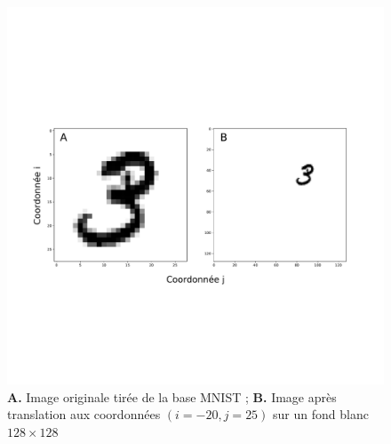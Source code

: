 \begin{figure}[th]
\centering
\includegraphics[scale=0.3]{Figures/mnist_reshape}
\decoRule %
\caption[Figure]{\textbf{A.} Image originale tirée de la base MNIST ; \textbf{B.} Image après translation aux coordonnées $(i=-20,j=25)$ sur un fond blanc $128\times128$}
\label{fig:mnist_reshape}
\end{figure}

